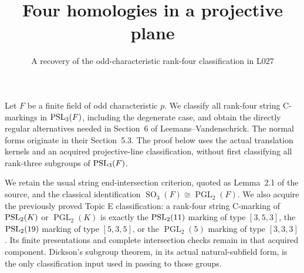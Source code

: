 \documentclass[11pt]{article}
\title{Four homologies in a projective plane}
\author{A recovery of the odd-characteristic rank-four classification in L027}
\date{}
\newcommand{\PGL}{\operatorname{PGL}}\newcommand{\SL}{\operatorname{SL}}
\newcommand{\SO}{\operatorname{SO}}
\begin{document}
\maketitle
Let $F$ be a finite field of odd characteristic $p$. We classify all rank-four string
C-markings in $\operatorname{PSL}_3(F)$, including the degenerate case, and obtain
the directly regular alternatives needed in Section~6 of
Leemans--Vandenschrick. The normal forms originate in their Section~5.3.
The proof below uses the actual translation kernels and an acquired
projective-line classification, without first classifying all rank-three
subgroups of $\operatorname{PSL}_3(F)$.

We retain the usual string end-intersection criterion, quoted as
Lemma~2.1 of the source, and the classical identification
$\SO_3(F)\cong\PGL_2(F)$. We also acquire the previously proved
Topic E classification: a rank-four string C-marking of $\operatorname{PSL}_2(K)$
or $\PGL_2(K)$ is exactly the $\operatorname{PSL}_2(11)$ marking of type $[3,5,3]$,
the $\operatorname{PSL}_2(19)$ marking of type $[5,3,5]$, or the $\PGL_2(5)$
marking of type $[3,3,3]$. Its finite presentations and complete
intersection checks remain in that acquired component. Dickson's
subgroup theorem, in its actual natural-subfield form, is the only
classification input used in passing to those groups.
\end{document}
